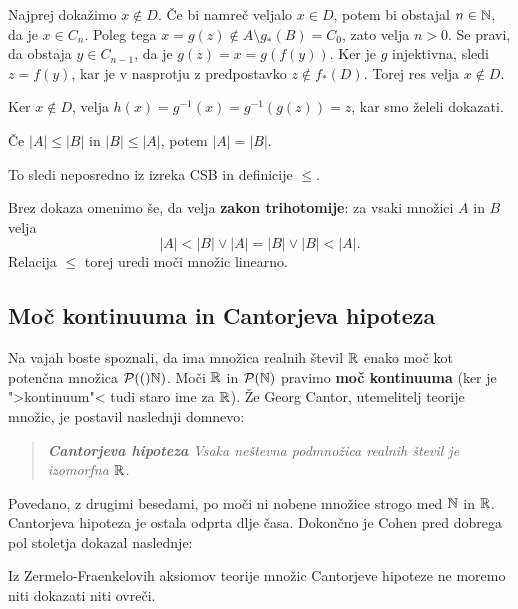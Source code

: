 \begin{dokaz}
\begin{enumerate}
    Najprej dokažimo $x \not\in D$. Če bi namreč veljalo $x \in D$, potem bi
    obstajal $n \in \mathbb{N}$, da je $x \in C_n$. Poleg tega
    $x = g(z) \not\in A \setminus g_{*}(B) = C_0$, zato velja $n > 0$. Se pravi,
    da obstaja $y \in C_{n-1}$, da je $g(z) = x = g(f(y))$. Ker je $g$
    injektivna, sledi $z = f(y)$, kar je v nasprotju z predpostavko
    $z \not\in f_{*}(D)$. Torej res velja $x \not\in D$.

    Ker $x \not\in D$, velja $h(x) = g^{-1}(x) = g^{-1}(g(z)) = z$, kar smo
    želeli dokazati.
  \end{enumerate}
\end{dokaz}

\begin{posledica}
  Če $|A| \leq |B|$ in $|B| \leq |A|$, potem $|A| = |B|$.
\end{posledica}

\begin{dokaz}
  To sledi neposredno iz izreka CSB in definicije $\leq$.
\end{dokaz}

Brez dokaza omenimo še, da velja \textbf{zakon trihotomije}: za vsaki množici $A$ in $B$
velja
%
\begin{equation*}
  |A| < |B| \lor |A| = |B| \lor |B| < |A|.
\end{equation*}
%
Relacija $\leq$ torej uredi moči množic linearno.



\subsection{Moč kontinuuma in Cantorjeva hipoteza}

Na vajah boste spoznali, da ima množica realnih števil $\mathbb{R}$ enako moč kot potenčna množica $\mathcal{P}(()\mathbb{N})$. Moči $\mathbb{R}$ in $\mathcal{P}(\mathbb{N})$ pravimo \textbf{moč kontinuuma} (ker je ">kontinuum"< tudi staro ime za $\mathbb{R}$). Že Georg Cantor, utemelitelj teorije množic, je postavil naslednji domnevo:
%
\begin{quote}
  \emph{\textbf{Cantorjeva hipoteza} Vsaka neštevna podmnožica realnih števil je izomorfna $\mathbb{R}$.}
\end{quote}
%
Povedano, z drugimi besedami, po moči ni nobene množice strogo med $\mathbb{N}$ in $\mathbb{R}$. Cantorjeva hipoteza je ostala odprta dlje časa. Dokončno je Cohen pred dobrega pol stoletja dokazal naslednje:

\begin{izrek}[Cohen]
  Iz Zermelo-Fraenkelovih aksiomov teorije množic Cantorjeve hipoteze ne moremo niti dokazati niti ovreči.
\end{izrek}

